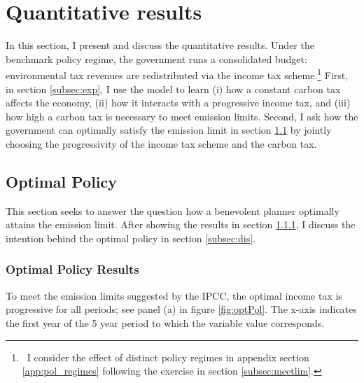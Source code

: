 \section{Quantitative results}\label{sec:res}

In this section, I present and discuss the quantitative results. Under the benchmark policy regime, the government runs a consolidated budget: environmental tax revenues are redistributed via the income tax scheme.\footnote{\ I consider the effect of distinct policy regimes in appendix section \ref{app:pol_regimes} following the exercise in section \ref{subsec:meetlim}. }
First, in section \ref{subsec:exp}, I use the model to learn (i) how a constant carbon tax affects the economy, (ii) how it interacts with a progressive income tax, and (iii) how high a carbon tax is necessary to meet emission limits.
Second, I ask how the government can optimally satisfy the emission limit in section \ref{subsec:mr} by jointly choosing the progressivity of the income tax scheme and the carbon tax. 



\subsection{Optimal Policy}\label{subsec:mr}


This section seeks to answer the question how a benevolent planner optimally attains the emission limit. After showing the results in section \ref{sec:optres}, I discuss the intention behind the optimal policy in section \ref{subsec:dis}. 

\subsubsection{Optimal Policy Results}\label{sec:optres}
To meet the emission limits suggested by the IPCC, the optimal income tax is progressive for all periods; see panel (a) in figure \ref{fig:optPol}.  The x-axis indicates the first year of the 5 year period to which the variable value corresponds. 


